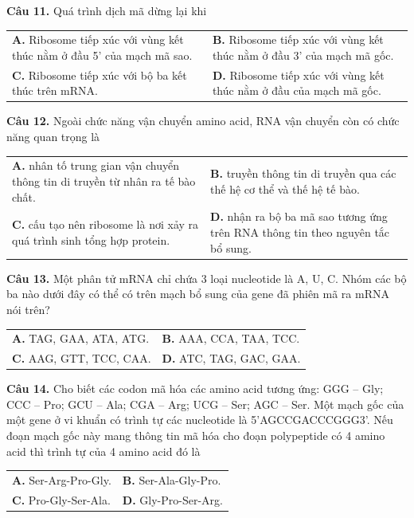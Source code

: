 \documentclass{article}
\begin{document}
\begin{minipage}[t][14.4cm][t]{\linewidth}
\fontsize{20}{26}\selectfont

\textbf{Câu 11.} Quá trình dịch mã dừng lại khi\\[4pt]
\begin{tabularx}{\linewidth}{@{}X X@{}}
\textbf{A. } Ribosome tiếp xúc với vùng kết thúc nằm ở đầu 5' của mạch mã sao. & \textbf{B. } Ribosome tiếp xúc với vùng kết thúc nằm ở đầu 3' của mạch mã gốc.\\[4pt]
\textbf{C. } Ribosome tiếp xúc với bộ ba kết thúc trên mRNA. & \textbf{D. } Ribosome tiếp xúc với vùng kết thúc nằm ở đầu của mạch mã gốc.
\end{tabularx}
\vspace*{\fill}
\textbf{Câu 12.} Ngoài chức năng vận chuyển amino acid, RNA vận chuyển còn có chức năng quan trọng là\\[4pt]
\begin{tabularx}{\linewidth}{@{}X X@{}}
\textbf{A. } nhân tố trung gian vận chuyển thông tin di truyền từ nhân ra tế bào chất. & \textbf{B. } truyền thông tin di truyền qua các thế hệ cơ thể và thế hệ tế bào.\\[4pt]
\textbf{C. } cấu tạo nên ribosome là nơi xảy ra quá trình sinh tổng hợp protein. & \textbf{D. } nhận ra bộ ba mã sao tương ứng trên RNA thông tin theo nguyên tắc bổ sung.
\end{tabularx}

\end{minipage}
\newpage


\begin{minipage}[t][14.4cm][t]{\linewidth}
\fontsize{20}{26}\selectfont

\textbf{Câu 13.} Một phân tử mRNA chỉ chứa 3 loại nucleotide là A, U, C. Nhóm các bộ ba nào dưới đây có thể có trên mạch bổ sung của gene đã phiên mã ra mRNA nói trên?\\[4pt]
\begin{tabularx}{\linewidth}{@{}X X@{}}
\textbf{A. } TAG, GAA, ATA, ATG. & \textbf{B. } AAA, CCA, TAA, TCC.\\[4pt]
\textbf{C. } AAG, GTT, TCC, CAA. & \textbf{D. } ATC, TAG, GAC, GAA.
\end{tabularx}
\vspace*{\fill}
\textbf{Câu 14.} Cho biết các codon mã hóa các amino acid tương ứng: GGG – Gly; CCC – Pro; GCU – Ala; CGA – Arg; UCG – Ser; AGC – Ser. Một mạch gốc của một gene ở vi khuẩn có trình tự các nucleotide là 5'AGCCGACCCGGG3'. Nếu đoạn mạch gốc này mang thông tin mã hóa cho đoạn polypeptide có 4 amino acid thì trình tự của 4 amino acid đó là\\[4pt]
\begin{tabularx}{\linewidth}{@{}X X@{}}
\textbf{A. } Ser-Arg-Pro-Gly. & \textbf{B. } Ser-Ala-Gly-Pro.\\[4pt]
\textbf{C. } Pro-Gly-Ser-Ala. & \textbf{D. } Gly-Pro-Ser-Arg.
\end{tabularx}

\end{minipage}
\newpage
\end{document}
